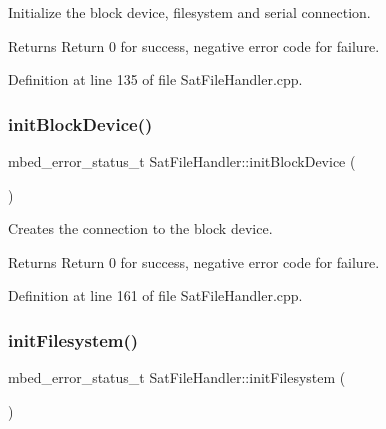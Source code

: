 Initialize the block device, filesystem and serial connection. 

\begin{DoxyReturn}{Returns}
Return 0 for success, negative error code for failure. 
\end{DoxyReturn}


Definition at line 135 of file Sat\+File\+Handler.\+cpp.

\mbox{\label{class_sat_file_handler_a6c31918d174a3161389665ef6c32c064}} 
\subsubsection{\texorpdfstring{initBlockDevice()}{initBlockDevice()}}
{\footnotesize\ttfamily mbed\+\_\+error\+\_\+status\+\_\+t Sat\+File\+Handler\+::init\+Block\+Device (\begin{DoxyParamCaption}{ }\end{DoxyParamCaption})\hspace{0.3cm}{\ttfamily [private]}}



Creates the connection to the block device. 

\begin{DoxyReturn}{Returns}
Return 0 for success, negative error code for failure. 
\end{DoxyReturn}


Definition at line 161 of file Sat\+File\+Handler.\+cpp.

\mbox{\label{class_sat_file_handler_a627ea649602f208a18a7248b3c1c966a}} 
\subsubsection{\texorpdfstring{initFilesystem()}{initFilesystem()}}
{\footnotesize\ttfamily mbed\+\_\+error\+\_\+status\+\_\+t Sat\+File\+Handler\+::init\+Filesystem (\begin{DoxyParamCaption}{ }\end{DoxyParamCaption})\hspace{0.3cm}{\ttfamily [private]}}



